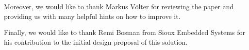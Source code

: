 \documentclass[preprint,numbers,10pt]{sigplanconf}
\begin{document}
Moreover, we would like to thank Markus V\"olter for reviewing the paper and providing us with many helpful hints on how to improve it.

Finally, we would like to thank Remi Bosman from Sioux Embedded Systems for his contribution to the initial design proposal of this solution.



\end{document}

